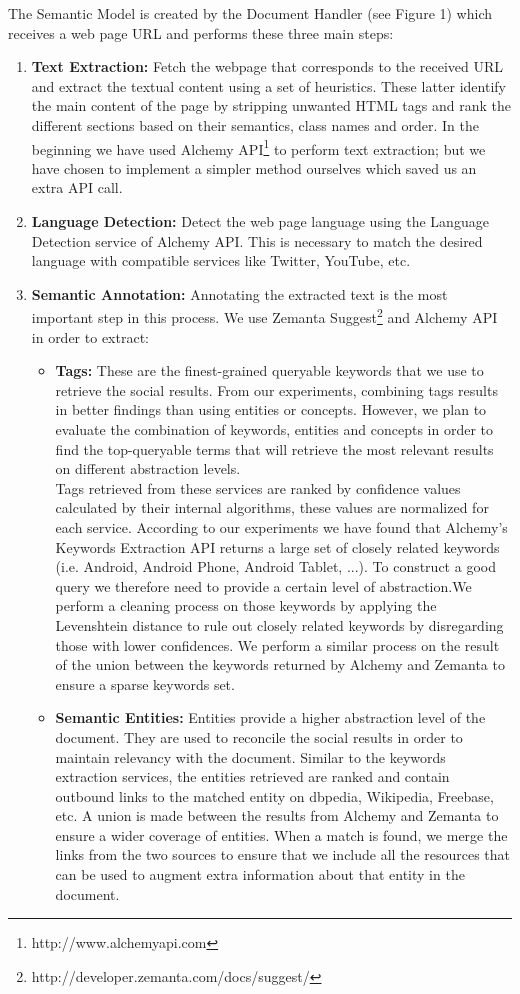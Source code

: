 \documentclass[onecolumn, crcready]{iosart2c}
\begin{document}
The Semantic Model is created by the Document Handler (see Figure 1) which receives a web page URL and performs these three main steps:
\begin{enumerate}
\item {\bf Text Extraction:} Fetch the webpage that corresponds to the received URL and extract the textual content using a set of heuristics. These latter identify the main content of the page by stripping unwanted HTML tags and rank the different sections based on their semantics, class names and order. In the beginning we have used Alchemy API\footnote{http://www.alchemyapi.com} to perform text extraction; but we have chosen to implement a simpler method ourselves which saved us an extra API call. 
\item {\bf Language Detection:} Detect the web page language using the Language Detection service of Alchemy API. This is necessary to match the desired language with compatible services like Twitter, YouTube, etc.
\item {\bf Semantic Annotation:} Annotating the extracted text is the most important step in this process. We use Zemanta Suggest\footnote{http://developer.zemanta.com/docs/suggest/} and Alchemy API in order to extract: 
\begin{itemize}
\item {\bf Tags:} These are the finest-grained queryable keywords that we use to retrieve the social results. From our experiments, combining tags results in better findings than using entities or concepts. However, we plan to evaluate the combination of keywords, entities and concepts in order to find the top-queryable terms that will retrieve the most relevant results on different abstraction levels.
\\Tags retrieved from these services are ranked by confidence values calculated by their internal algorithms, these values are normalized for each service. According to our experiments we have found that Alchemy's Keywords Extraction API returns a large set of closely related keywords (i.e. Android, Android Phone, Android Tablet, ...). To construct a good query we therefore need to provide a certain level of abstraction.We perform a cleaning process on those keywords by applying the Levenshtein distance to rule out closely related keywords by disregarding those with lower confidences. We perform a similar process on the result of the union between the keywords returned by Alchemy and Zemanta to ensure a sparse keywords set.
\item {\bf Semantic Entities:} Entities provide a higher abstraction level of the document. They are used to reconcile the social results in order to maintain relevancy with the document. Similar to the keywords extraction services, the entities retrieved are ranked and contain outbound links to the matched entity on dbpedia, Wikipedia, Freebase, etc. A union is made between the results from Alchemy and Zemanta to ensure a wider coverage of entities. When a match is found, we merge the links from the two sources to ensure that we include all the resources that can be used to augment extra information about that entity in the document. 

\end{itemize}
\end{enumerate}
\end{document}
